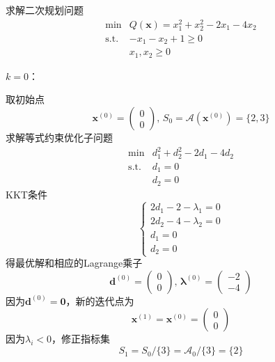 \begin{example}
    求解二次规划问题
    \[
        \begin{array}{rl}
            \operatorname*{min} & Q(\boldsymbol{x})=x_{1}^{2}+x_{2}^{2}-2x_{1}-4x_{2}\\
            \mathrm{s.t.}&-x_{1}-x_{2}+1\geqslant0\\
            &x_{1},x_{2}\geqslant 0
        \end{array}    
    \]
    \begin{solution}
        \colorbox{cyan!50}{$k = 0$：}

        取初始点
        \[
            \boldsymbol{x}^{(0)}=\begin{pmatrix}0\\0\end{pmatrix},\, S_0=\mathcal{A}(\boldsymbol{x}^{(0)})=\{2,3\}
        \]
        求解等式约束优化子问题
        \[
            \begin{array}{rl}
                \min & d_{1}^{2}+d_{2}^{2}-2d_{1}-4d_{2}\\
                \mathrm{s.t.} & d_{1}=0\\
                & d_{2}=0
            \end{array}
        \]
        KKT条件
        \[
            \left\{
                \begin{array}{l}
                    2d_1-2-\lambda_1 = 0\\
                    2d_2-4-\lambda_2 = 0\\
                    d_1 = 0\\
                    d_2 = 0
                \end{array}
            \right.
        \]
        得最优解和相应的Lagrange乘子
        \[
            \boldsymbol{d}^{(0)}=\begin{pmatrix}0\\0\end{pmatrix},\,
            \boldsymbol{\lambda}^{(0)}=\begin{pmatrix}-2\\-4\end{pmatrix}
        \]
        因为$\boldsymbol{d}^{(0)} = \boldsymbol{0}$，新的迭代点为
        \[
            \boldsymbol{x}^{(1)}= \boldsymbol{x}^{(0)} = \begin{pmatrix}0\\0\end{pmatrix}
        \]
        因为$\lambda_{i} <0$，修正指标集
        \[
            S_1=S_0/\{3\}=\mathcal{A}_0/\{3\}=\{2\}
        \]


\end{solution}
\end{example}
